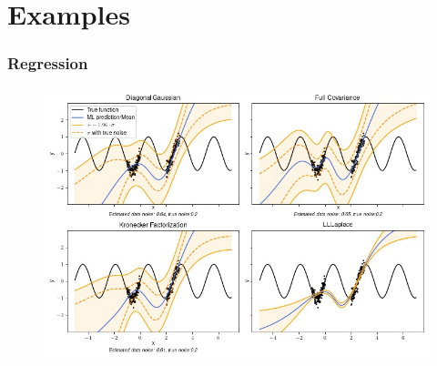 \documentclass{beamer}
\begin{document}
        \section{Examples}

        \begin{frame}
            \frametitle{Regression}
            \begin{figure}
                \includegraphics[width=\textwidth]{images/Regression/kernel_comparison.jpg}
            \end{figure}
        \end{frame}




\end{document}
